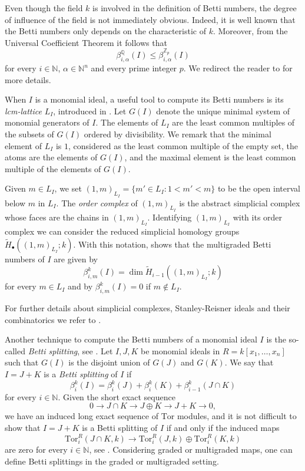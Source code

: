 \documentclass[11pt,oneside]{amsart}
\theoremstyle{plain}
\theoremstyle{definition}
\newcommand{\N}{\mathbb{N}}
\begin{document}
Even though the field $k$ is involved in the definition of Betti numbers, the degree of influence of the field is not immediately obvious. Indeed, it is well known that the Betti numbers only depends on the characteristic of $k$. Moreover, from the Universal Coefficient Theorem it follows that 
\begin{equation}\label{Eq.universalCoefficientTheorem}
\beta^{\mathbb{Q}}_{i,\alpha}(I) \leq \beta^{\mathbb{Z}_p}_{i,\alpha}(I)
\end{equation}
for every $i \in \mathbb{N}$, $\alpha \in \N^n$ and every prime integer $p$. We redirect the reader to \cite[Proposition 1.3]{K06} for more details. 

When $I$ is a monomial ideal, a useful tool to compute its Betti numbers is its {\it lcm-lattice} $L_I$, introduced in \cite{GPW99}. Let $G(I)$ denote the unique minimal system of monomial generators of $I$. The elements of $L_I$ are the least common multiples of the subsets of $G(I)$ ordered by divisibility. We remark that the minimal element of $L_I$ is $1$, considered as the least common multiple of the
empty set, the atoms are the elements of $G(I)$, and the maximal element is the least common multiple of the elements of $G(I)$.

Given $m \in L_I$, we set $(1,m)_{L_I}=\{m' \in L_I : 1 < m' < m \}$ to be the open interval below $m$ in $L_I$. The {\it order complex} of $(1,m)_{L_I}$ is the abstract simplicial complex whose faces are the chains in $(1,m)_{L_I}$. Identifying $(1,m)_{L_I}$ with its order complex
we can consider the reduced simplicial homology groups
$\widetilde{H}_{\bullet} ((1,m)_{L_I}; k)$.
With this notation, \cite[Theorem 2.1]{GPW99} shows that the multigraded Betti numbers of $I$ are given by
\[
\beta^k_{i,m}(I)= \dim \widetilde{H}_{i-1} ((1,m)_{L_I}; k)
\]
for every $m \in L_I$ and by $\beta^k_{i,m}(I)=0$ if $m \notin L_I$.

For further details about simplicial complexes, Stanley-Reisner ideals and their combinatorics we refer to \cite{HH11}.

Another technique to compute the Betti numbers of a monomial ideal $I$ is the so-called {\it Betti splitting}, see \cite{FHV09, B16, BF20}.
Let $I,J,K$ be monomial ideals in $R=k[x_1,\dots,x_n]$ such that $G(I)$ is the disjoint union of $G(J)$ and $G(K)$. We say that $I=J+K$ is a {\it Betti splitting} of $I$ if
$$\beta^k_{i}(I)=\beta^k_{i}(J)+\beta^k_{i}(K)+\beta^k_{i-1}(J \cap K)$$
for every $i \in \mathbb{N}$. Given the short exact sequence $$0 \rightarrow J \cap K \rightarrow J \oplus K \rightarrow J+K \rightarrow 0,$$ we have an induced long exact sequence of $\mathrm{Tor}$ modules, and it is not difficult to show that $I=J+K$ is a Betti splitting of $I$ if and only if the induced maps
\[
\mathrm{Tor}^R_i(J \cap K,k) \rightarrow \mathrm{Tor}^R_i(J,k) \oplus \mathrm{Tor}^R_i(K,k)
\]
are zero for every $i \in \mathbb{N}$, see \cite[Proposition 2.1]{FHV09}. Considering graded or multigraded maps, one can define Betti splittings in the graded or multigraded setting. 
\end{document}
